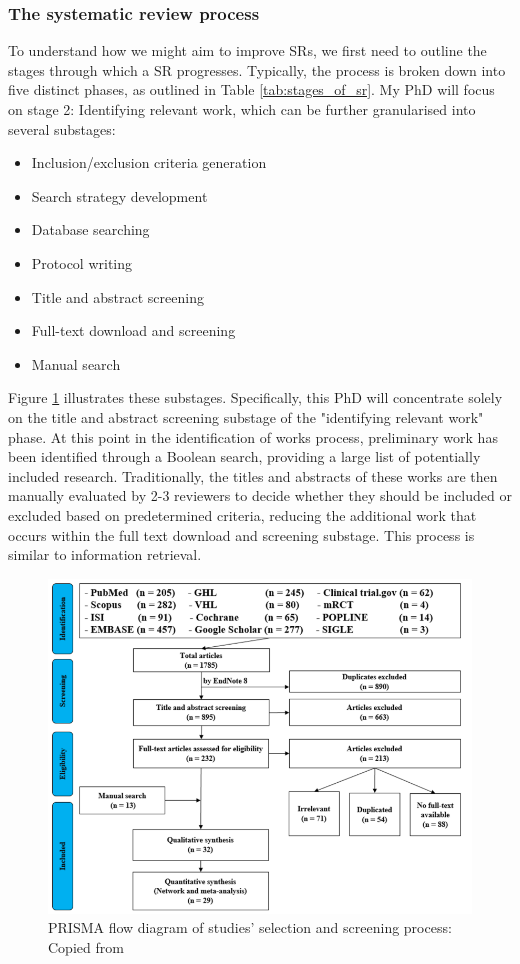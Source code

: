 \documentclass[../main.tex]{subfiles}
\begin{document}
\subsubsection{The systematic review process}

To understand how we might aim to improve SRs, we first need to outline the stages through which a SR progresses. Typically, the process is broken down into five distinct phases, as outlined in  Table \ref{tab:stages_of_sr}.
My PhD will focus on stage 2: Identifying relevant work, which can be further granularised into several substages:

\begin{itemize}
    \item Inclusion/exclusion criteria generation
    \item Search strategy development
    \item Database searching
    \item Protocol writing
    \item Title and abstract screening
    \item Full-text download and screening
    \item Manual search
\end{itemize}

Figure \ref{fig:selection_and_screening} illustrates these substages.
Specifically, this PhD will concentrate solely on the title and abstract screening substage of the "identifying relevant work" phase. At this point in the identification of works process, preliminary work has been identified through a Boolean search, providing a large list of potentially included research. Traditionally, the titles and abstracts of these works are then manually evaluated by 2-3 reviewers to decide whether they should be included or excluded based on predetermined criteria, reducing the additional work that occurs within the full text download and screening substage. This process is similar to information retrieval.

\begin{figure}
    \centering
    \includegraphics[width=0.8\linewidth]{sections//images/reproduced_step_by_step_guide.png}
    \caption{PRISMA flow diagram of studies' selection and screening process: Copied from \cite{tawfik_step_2019}}
    \label{fig:selection_and_screening}
\end{figure}
\end{document}

